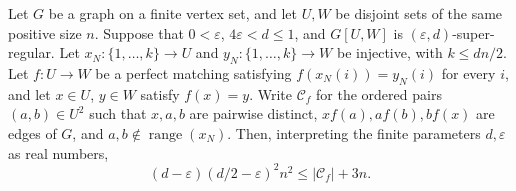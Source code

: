 \begin{lemma}
Let $G$ be a graph on a finite vertex set, and let $U,W$ be disjoint sets of
the same positive size $n$. Suppose that $0<\varepsilon$, $4\varepsilon<d\leq1$,
and $G[U,W]$ is $(\varepsilon,d)$-super-regular. Let
$x_N:\{1,\ldots,k\}\to U$ and $y_N:\{1,\ldots,k\}\to W$ be injective,
with $k\leq dn/2$. Let $f:U\to W$ be a perfect matching satisfying
$f(x_N(i))=y_N(i)$ for every $i$, and let $x\in U$, $y\in W$ satisfy $f(x)=y$.
Write $\mathcal C_f$ for the ordered pairs $(a,b)\in U^2$ such that
$x,a,b$ are pairwise distinct, $xf(a),af(b),bf(x)$ are edges of $G$,
and $a,b\notin\operatorname{range}(x_N)$. Then, interpreting the finite
parameters $d,\varepsilon$ as real numbers,
\[
 (d-\varepsilon)(d/2-\varepsilon)^2 n^2\leq |\mathcal C_f|+3n.
\]
\end{lemma}
